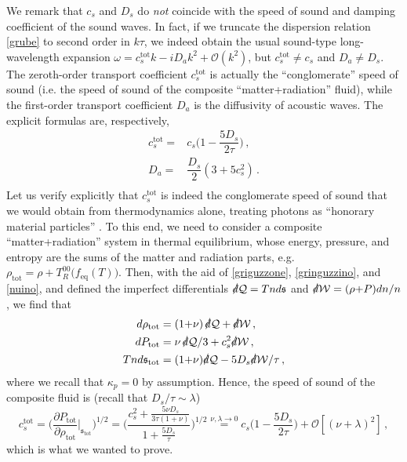 \documentclass[a4paper, amsfonts, amssymb, amsmath, reprint, showkeys, nofootinbib, twoside,notitlepage,onecolumn]{revtex4-2}
\theoremstyle{definition}
\theoremstyle{theorem}
\theoremstyle{corollary}
\begin{document}
We remark that $c_s$ and $D_s$ do \textit{not} coincide with the speed of sound and damping coefficient of the sound waves. In fact, if we truncate the dispersion relation \eqref{grube} to second order in $k\tau$, we indeed obtain the usual sound-type long-wavelength expansion $\omega=c_s^{\text{tot}}k-iD_a k^2 +\mathcal{O}(k^2)$, but $c_s^\text{tot} \neq c_s$ and $D_a \neq D_s$. The zeroth-order transport coefficient $c_s^{\text{tot}}$ is actually the ``conglomerate'' speed of sound (i.e. the speed of sound of the composite ``matter+radiation'' fluid), while the first-order transport coefficient $D_a$ is the diffusivity of acoustic waves. The explicit formulas are, respectively,
\begin{equation}\label{cstotdaa}
\begin{split}
c_s^{\text{tot}}={}& c_s \bigg( 1-\dfrac{5D_s}{2\tau}\bigg) \, , \\
D_a ={}& \dfrac{D_s}{2}(3+5c_s^2) \, .\\
\end{split}
\end{equation}
Let us verify explicitly that $c_s^\text{tot}$ is indeed the conglomerate speed of sound that we would obtain from thermodynamics alone, treating photons as ``honorary material particles'' \cite{mihalas_book}. To this end, we need to consider a composite ``matter+radiation'' system in thermal equilibrium, whose energy, pressure, and entropy are the sums of the matter and radiation parts, e.g. $\rho_\text{tot}=\rho+T_R^{00}\big(f_\text{eq}(T)\big)$. Then, with the aid of \eqref{griguzzone}, \eqref{gringuzzino}, and \eqref{nuino}, and defined the imperfect differentials $\slashed{d}\mathcal{Q}=Tnd\mathfrak{s}$ and $\slashed{d}\mathcal{W}=(\rho{+}P)dn/n$, we find that
\begin{equation}\label{grienz}
\begin{split}
d\rho_\text{tot}={} &  (1{+}\nu) \,  \slashed{d}\mathcal{Q}  + \slashed{d}\mathcal{W} \, , \\
dP_\text{tot}={} & \nu  \,  \slashed{d}\mathcal{Q}/3 + c_s^2 \slashed{d}\mathcal{W} \, , \\
Tn d\mathfrak{s}_\text{tot}={} & (1{+}\nu)\slashed{d}\mathcal{Q} - 5D_s  \slashed{d}\mathcal{W}/\tau  \, , \\
\end{split}
\end{equation}
where we recall that $\kappa_p{=}0$ by assumption. Hence, the speed of sound of the composite fluid is (recall that $D_s/\tau {\sim} \lambda$)
\begin{equation}
c_s^\text{tot} =\bigg( \dfrac{\partial P_\text{tot}}{\partial \rho_\text{tot}}\bigg|_{\mathfrak{s}_\text{tot}}\bigg)^{1/2}=\bigg( \dfrac{c_s^2 +\frac{5 \nu D_s}{3\tau (1{+}\nu)}}{1+\frac{5D_s}{\tau}}\bigg)^{1/2} \stackrel{\nu,\lambda \rightarrow 0}{=}  c_s \bigg(1-\dfrac{5D_s}{2\tau} \bigg) +\mathcal{O}[(\nu {+}\lambda)^2]\, ,
\end{equation}
which is what we wanted to prove.
\end{document}
